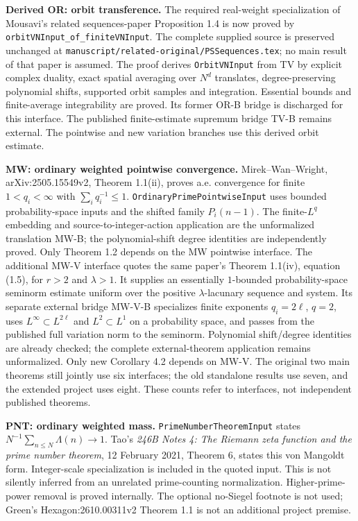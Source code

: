\textbf{Derived OR: orbit transference.} The required real-weight specialization of Mousavi's related sequences-paper Proposition 1.4 is now proved by \texttt{orbitVNInput\_\allowbreak{}of\_\allowbreak{}finiteVNInput}. The complete supplied source is preserved unchanged at \texttt{manuscript/}\allowbreak\texttt{related-original/}\allowbreak\texttt{PSSequences.tex}; no main result of that paper is assumed. The proof derives \texttt{OrbitVNInput} from TV by explicit complex duality, exact spatial averaging over $N^d$ translates, degree-preserving polynomial shifts, supported orbit samples and integration. Essential bounds and finite-average integrability are proved. Its former OR-B bridge is discharged for this interface. The published finite-estimate supremum bridge TV-B remains external. The pointwise and new variation branches use this derived orbit estimate.

\textbf{MW: ordinary weighted pointwise convergence.} Mirek--Wan--Wright, arXiv:2505.15549v2, Theorem 1.1(ii), proves a.e. convergence for finite $1<q_i<\infty$ with $\sum_iq_i^{-1}\leq1$. \texttt{OrdinaryPrimePointwiseInput} uses bounded probability-space inputs and the shifted family $P_i(n-1)$. The finite-$L^q$ embedding and source-to-integer-action application are the unformalized translation MW-B; the polynomial-shift degree identities are independently proved. Only Theorem 1.2 depends on the MW pointwise interface. The additional MW-V interface quotes the same paper's Theorem 1.1(iv), equation (1.5), for $r>2$ and $\lambda>1$. It supplies an essentially $1$-bounded probability-space seminorm estimate uniform over the positive $\lambda$-lacunary sequence and system. Its separate external bridge MW-V-B specializes finite exponents $q_i=2\ell$, $q=2$, uses $L^\infty\subset L^{2\ell}$ and $L^2\subset L^1$ on a probability space, and passes from the published full variation norm to the seminorm. Polynomial shift/degree identities are already checked; the complete external-theorem application remains unformalized. Only new Corollary 4.2 depends on MW-V. The original two main theorems still jointly use six interfaces; the old standalone results use seven, and the extended project uses eight. These counts refer to interfaces, not independent published theorems.

\textbf{PNT: ordinary weighted mass.} \texttt{PrimeNumberTheoremInput} states $N^{-1}\sum_{n\leq N}\Lambda(n)\to1$. Tao's \emph{246B Notes 4: The Riemann zeta function and the prime number theorem}, 12 February 2021, Theorem 6, states this von Mangoldt form. Integer-scale specialization is included in the quoted input. This is not silently inferred from an unrelated prime-counting normalization. Higher-prime-power removal is proved internally. The optional no-Siegel footnote is not used; Green's Hexagon:2610.00311v2 Theorem 1.1 is not an additional project premise.

